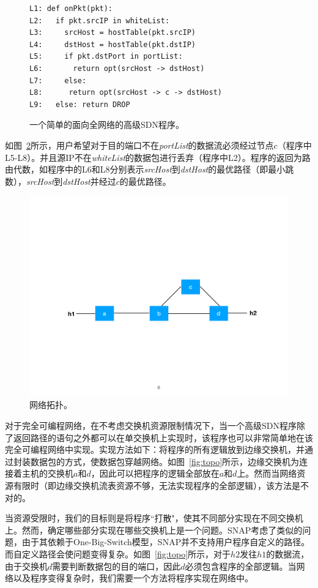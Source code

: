 \begin{figure}[h]
\begin{verbatim}
L1: def onPkt(pkt):
L2:   if pkt.srcIP in whiteList:
L3:     srcHost = hostTable(pkt.srcIP)
L4:     dstHost = hostTable(pkt.dstIP)
L5:     if pkt.dstPort in portList:
L6:       return opt(srcHost -> dstHost)
L7:     else:
L8:      return opt(srcHost -> c -> dstHost)
L9:   else: return DROP
\end{verbatim}
    \caption{\small 一个简单的面向全网络的高级SDN程序。}
\label{fig:code1}
\end{figure}

如图~\ref{fig:topo1}所示，用户希望对于目的端口不在\emph{portList}的数据流必须经过节点$c$（程序中L5-L8）。并且源IP不在\emph{whiteList}的数据包进行丢弃（程序中L2）。程序的返回为路由代数，如程序中的L6和L8分别表示\emph{srcHost}到\emph{dstHost}的最优路径（即最小跳数），\emph{srcHost}到\emph{dstHost}并经过$c$的最优路径。

\begin{figure}[!htbp]
\includegraphics[width=0.8\linewidth]{figures/global-topo.pdf}
\centering
\caption{\small 网络拓扑。}
\label{fig:topo1}
\end{figure}

对于完全可编程网络，在不考虑交换机资源限制情况下，当一个高级SDN程序除了返回路径的语句之外都可以在单交换机上实现时，该程序也可以非常简单地在该完全可编程网络中实现。实现方法如下：将程序的所有逻辑放到边缘交换机，并通过封装数据包的方式，使数据包穿越网络。如图~\ref{fig:topo}所示，边缘交换机为连接着主机的交换机$a$和$d$，因此可以把程序的逻辑全部放在$a$和$d$上。然而当网络资源有限时（即边缘交换机流表资源不够，无法实现程序的全部逻辑），该方法是不对的。

当资源受限时，我们的目标则是将程序``打散"，使其不同部分实现在不同交换机上。然而，确定哪些部分实现在哪些交换机上是一个问题。SNAP考虑了类似的问题，由于其依赖于One-Big-Switch模型，SNAP并不支持用户程序自定义的路径。而自定义路径会使问题变得复杂。如图~\ref{fig:topo}所示，对于$h2$发往$h1$的数据流，由于交换机$d$需要判断数据包的目的端口，因此$d$必须包含程序的全部逻辑。当网络以及程序变得复杂时，我们需要一个方法将程序实现在网络中。



